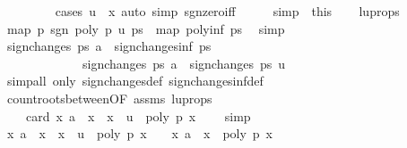 \begin{isabellebody}
\ \ \ \ \ \ \ \isamarkupfalse%
\ {\isacharparenleft}cases\ {\isachardoublequoteopen}u\ {\isasymle}\ x{\isachardoublequoteclose}{\isacharcomma}\ auto\ simp{\isacharcolon}\ sgn{\isacharunderscore}zero{\isacharunderscore}iff{\isacharparenright}\isanewline
\ \ \isacommand{{\isacharbraceright}}\isamarkupfalse%
\ \isamarkupfalse%
\ {\isacharbrackleft}simp{\isacharbrackright}\ {\isacharequal}\ this\isanewline
\isanewline
\ \ \isamarkupfalse%
\ lu{\isacharunderscore}props\isanewline
\ \ \ \ \isamarkupfalse%
\ {\isachardoublequoteopen}map\ {\isacharparenleft}{\isasymlambda}p{\isachardot}\ sgn\ {\isacharparenleft}poly\ p\ {\isacharquery}u{\isacharparenright}{\isacharparenright}\ ps\ {\isacharequal}\ map\ poly{\isacharunderscore}inf\ ps{\isachardoublequoteclose}\ \isamarkupfalse%
\ simp\isanewline
\ \ \isamarkupfalse%
\ {\isachardoublequoteopen}sign{\isacharunderscore}changes\ ps\ a\ {\isacharminus}\ sign{\isacharunderscore}changes{\isacharunderscore}inf\ ps\ {\isacharequal}\isanewline
\ \ \ \ \ \ \ \ \ \ \ \ \ sign{\isacharunderscore}changes\ ps\ a\ {\isacharminus}\ sign{\isacharunderscore}changes\ ps\ {\isacharquery}u{\isachardoublequoteclose}\isanewline
\ \ \ \ \ \ \isamarkupfalse%
\ {\isacharparenleft}simp{\isacharunderscore}all\ only{\isacharcolon}\ sign{\isacharunderscore}changes{\isacharunderscore}def\ sign{\isacharunderscore}changes{\isacharunderscore}inf{\isacharunderscore}def{\isacharparenright}\isanewline
\ \ \isamarkupfalse%
\ \isamarkupfalse%
\ count{\isacharunderscore}roots{\isacharunderscore}between{\isacharbrackleft}OF\ assms{\isacharbrackright}\ lu{\isacharunderscore}props\isanewline
\ \ \ \ \ \ \isamarkupfalse%
\ {\isachardoublequoteopen}{\isachardot}{\isachardot}{\isachardot}\ {\isacharequal}\ \ card\ {\isacharbraceleft}x{\isachardot}\ a\ {\isacharless}\ x\ {\isasymand}\ x\ {\isasymle}\ {\isacharquery}u\ {\isasymand}\ poly\ p\ x\ {\isacharequal}\ {}{\isacharbraceright}{\isachardoublequoteclose}\ \isamarkupfalse%
\ simp\isanewline
\ \ \isamarkupfalse%
\ \isamarkupfalse%
\ {\isachardoublequoteopen}{\isacharbraceleft}x{\isachardot}\ a\ {\isacharless}\ x\ {\isasymand}\ x\ {\isasymle}\ {\isacharquery}u\ {\isasymand}\ poly\ p\ x\ {\isacharequal}\ {}{\isacharbraceright}\ {\isacharequal}\ {\isacharbraceleft}x{\isachardot}\ a\ {\isacharless}\ x\ {\isasymand}\ poly\ p\ x\ {\isacharequal}\ {}{\isacharbraceright}{\isachardoublequoteclose}\isanewline

\end{isabellebody}
